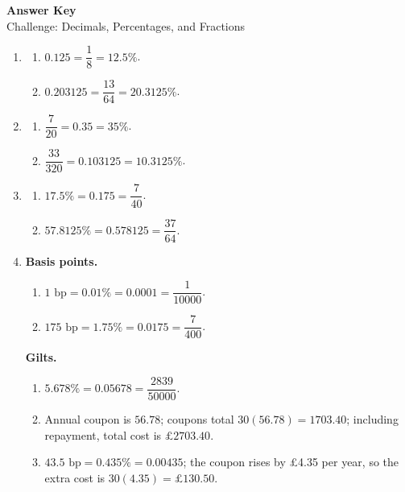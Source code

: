 \documentclass[12pt]{article}
\begin{document}

\begin{center}
{\LARGE\bfseries Answer Key}\\[0.3em]
{\large Challenge: Decimals, Percentages, and Fractions}
\end{center}

\begin{enumerate}[label=\textbf{Q\arabic*.}]

\item
\begin{enumerate}[label=(\alph*)]
\item $0.125=\dfrac{1}{8}=12.5\%$.
\item $0.203125=\dfrac{13}{64}=20.3125\%$.
\end{enumerate}

\item
\begin{enumerate}[label=(\alph*)]
\item $\dfrac{7}{20}=0.35=35\%$.
\item $\dfrac{33}{320}=0.103125=10.3125\%$.
\end{enumerate}

\item
\begin{enumerate}[label=(\alph*)]
\item $17.5\%=0.175=\dfrac{7}{40}$.
\item $57.8125\%=0.578125=\dfrac{37}{64}$.
\end{enumerate}

\item
\textbf{Basis points.}
\begin{enumerate}[label=(\alph*)]
\item $1\text{ bp}=0.01\%=0.0001=\dfrac{1}{10000}$.
\item $175\text{ bp}=1.75\%=0.0175=\dfrac{7}{400}$.
\end{enumerate}

\medskip
\textbf{Gilts.}
\begin{enumerate}[label=(\alph*), start=3]
\item $5.678\%=0.05678=\dfrac{2839}{50000}$.
\item Annual coupon is $56.78$; coupons total $30(56.78)=1703.40$; including repayment, total cost is $\pounds2703.40$.

\medskip
\item $43.5\text{ bp}=0.435\%=0.00435$; the coupon rises by \pounds 4.35 per year, so the extra cost is $30(4.35)=\pounds 130.50$.


\end{enumerate}
\end{enumerate}
\end{document}
